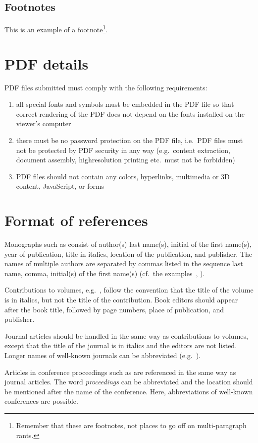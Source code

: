 \documentclass[11pt]{article}
\begin{document}
\subsection{Footnotes}

This is an example of a footnote\footnote{Remember that these are footnotes, not
places to go off on multi-paragraph rants.}.


\section{PDF details}

PDF files submitted must comply with the following requirements:

\begin{enumerate}
\item all special fonts and symbols must be embedded in the PDF file
so that correct rendering of the PDF does not depend on the fonts
installed on the viewer's computer
\item there must be no password protection on the PDF file, i.e.\ PDF
files must not be protected by PDF security in any way (e.g.\ content
extraction, document assembly, highresolution printing etc.\ must not
be forbidden)
\item PDF files should not contain any colors, hyperlinks, multimedia
or 3D content, JavaScript, or forms
\end{enumerate}


\section{Format of references}

Monographs such as  consist of author(s) last name(s),
initial of the first name(s), year of publication, title in italics, location of
the publication, and publisher. The names of multiple authors are separated by
commas listed in the sequence last name, comma, initial(s) of the first name(s)
(cf.\ the examples~,
).

Contributions to volumes, e.g.~, follow the
convention that the title of the volume is in italics, but not the
title of the contribution. Book editors should appear after the book title, 
followed by page numbers, place of publication, and publisher.

Journal articles should be handled in the same way as contributions to
volumes, except that the title of the journal is in italics and
the editors are not listed. Longer names of well-known journals can be
abbreviated (e.g.~).

Articles in conference proceedings such as  are
referenced in the same way as journal articles.  The word
\textit{proceedings} can be abbreviated and the location should be
mentioned after the name of the conference. Here, abbreviations of
well-known conferences are possible.



\end{document}
